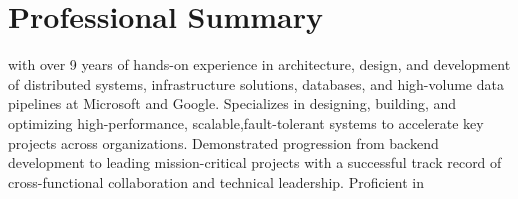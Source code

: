 \section{Professional Summary}
\normalsize{\POSITION{} with over 9 years of hands-on experience in architecture, design, and development of
    distributed systems, infrastructure solutions, databases, and high-volume data pipelines at Microsoft and Google. 
    Specializes in designing, building, and optimizing high-performance, scalable,fault-tolerant systems to accelerate
    key projects across organizations. Demonstrated progression from backend development to leading mission-critical
    projects with a successful track record of cross-functional collaboration and technical leadership. Proficient in
    \LanguagesOrderSummary\MainTechnologies}
